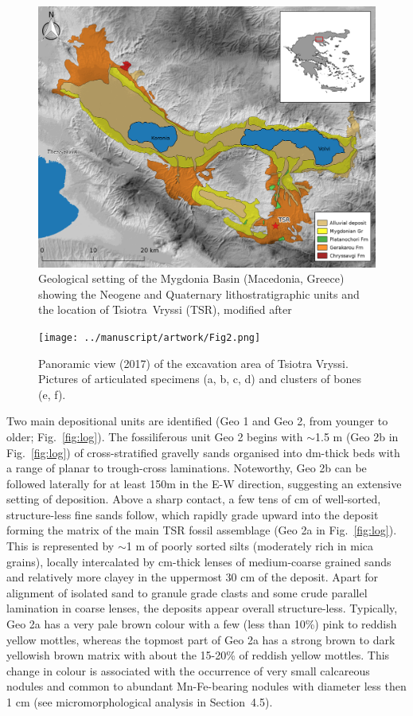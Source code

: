\documentclass[5p,times,authoryear]{elsarticle}
\begin{document}
\begin{figure}[]
  \centering
  \includegraphics[width=.8\textwidth]{../manuscript/artwork/Fig1.png}
  \caption{Geological setting of the Mygdonia Basin (Macedonia, Greece) showing the Neogene and Quaternary lithostratigraphic units and the location of Tsiotra~Vryssi (TSR), modified after \cite{Koufos1995}}
  \label{fig:1}
\end{figure}

\begin{figure}[]
  \centering
  \texttt{[image: ../manuscript/artwork/Fig2.png]}
  \caption{Panoramic view (2017) of the excavation area of Tsiotra Vryssi. Pictures of articulated specimens (a, b, c, d) and clusters of bones (e, f).}
  \label{fig:pics}
\end{figure}

Two main depositional units are identified (Geo 1 and Geo 2, from younger to older; Fig.~\ref{fig:log}). The fossiliferous unit Geo 2 begins with $\sim$1.5 m (Geo 2b in Fig.~\ref{fig:log}) of cross-stratified gravelly sands organised into dm-thick beds with a range of planar to trough-cross laminations. Noteworthy, Geo 2b can be followed laterally for at least 150m in the E-W direction, suggesting an extensive setting of deposition. Above a sharp contact, a few tens of cm of well-sorted, structure-less fine sands follow, which rapidly grade upward into the deposit forming the matrix of the main TSR fossil assemblage (Geo 2a in Fig.~\ref{fig:log}). This is represented by $\sim$1 m of poorly sorted silts (moderately rich in mica grains), locally intercalated by cm-thick lenses of medium-coarse grained sands and relatively more clayey in the uppermost 30 cm of the deposit. Apart for alignment of isolated sand to granule grade clasts and some crude parallel lamination in coarse lenses, the deposits appear overall structure-less. Typically, Geo 2a has a very pale brown colour with a few (less than 10\%) pink to reddish yellow mottles, whereas the topmost part of Geo 2a has a strong brown to dark yellowish brown matrix with about the 15-20\% of reddish yellow mottles. This change in colour is associated with the occurrence of very small calcareous nodules and common to abundant Mn-Fe-bearing nodules with diameter less then 1 cm (see micromorphological analysis in Section~4.5).
\end{document}
